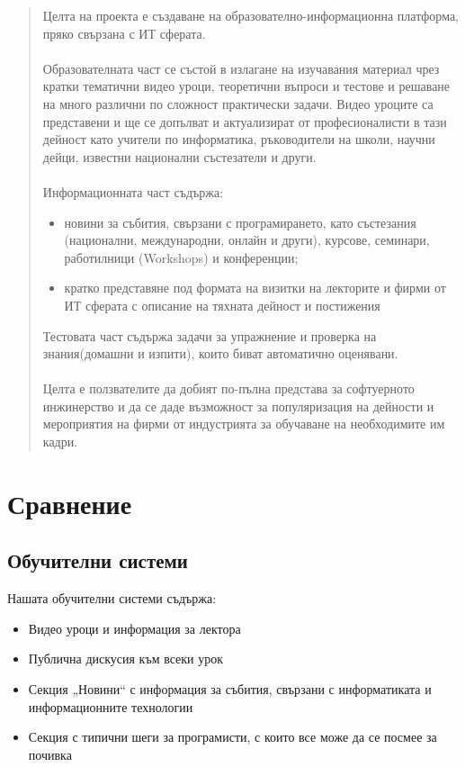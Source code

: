 \documentclass[12pt]{article}
\begin{document}
	\tableofcontents
	\newpage
	\begin{abstract}
		Целта на проекта е създаване на образователно-информационна платформа, пряко свързана с ИТ сферата.\\\\
		Образователната част се състой в излагане на изучавания материал чрез кратки тематични видео уроци, теоретични въпроси и тестове и решаване на много различни по сложност практически задачи. Видео уроците са представени и ще се допълват и актуализират от професионалисти в тази дейност като учители по информатика, ръководители на школи, научни дейци, известни национални състезатели и други.\\\\
		Информационната част съдържа:
		\begin{itemize}
			\item новини за събития, свързани с програмирането, като състезания (национални, международни, онлайн и други), курсове, семинари, работилници (Workshops) и конференции;
			\item кратко представяне под формата на визитки на лекторите и фирми от ИТ сферата с описание на тяхната дейност и постижения
		\end{itemize}
		Тестовата част съдържа задачи за упражнение и проверка на знания(домашни и изпити), които биват автоматично оценявани.\\\\
		Целта е ползвателите да добият по-пълна представа за софтуерното инжинерство и да се даде възможност за популяризация на дейности и мероприятия на фирми от индустрията за обучаване на необходимите им кадри.
	\end{abstract}
	\newpage
	\section{Сравнение}
	\subsection{Обучителни системи}
	Нашата обучителни системи съдържа:
	\begin{itemize}
	  \item Видео уроци и информация за лектора
	  \item Публична дискусия към всеки урок
	  \item Секция „Новини“ с информация за събития, свързани с информатиката и информационните технологии
	  \item Секция с типични шеги за програмисти, с които все може да се посмее за почивка
	\end{itemize}
\end{document}
